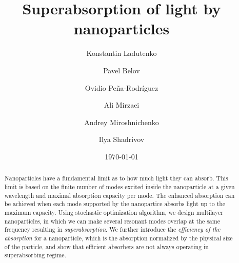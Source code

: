 \documentclass[aps,prl,twocolumn,showpacs,superscriptaddress,groupedaddress]{revtex4-1}
\begin{document}

\title{Superabsorption of light by nanoparticles} %

\author{Konstantin Ladutenko} 


\author{Pavel Belov} 

\author{Ovidio Pe\~{n}a-Rodr\'{i}guez} 

\author{Ali Mirzaei} \author{Andrey Miroshnichenko} \author{Ilya
  Shadrivov} 

\date{\today}

\begin{abstract}
  Nanoparticles have a fundamental limit as to how much light they can
  absorb. This limit is based on the finite number of modes excited
  inside the nanoparticle at a given wavelength and maximal absorption
  capacity per mode. The enhanced absorption can be achieved when each
  mode supported by the nanopartice absorbs light up to the maximum
  capacity. Using stochastic optimization algorithm, we design
  multilayer nanoparticles, in which we can make several resonant
  modes overlap at the same frequency resulting in {\it
    superabsorption}.  We further introduce the {\it efficiency of
    the absorption} for a nanoparticle, which is the absorption
  normalized by the physical size of the particle, and show that
  efficient absorbers are not always operating in superabsorbing
  regime.
\end{abstract}
\end{document}
